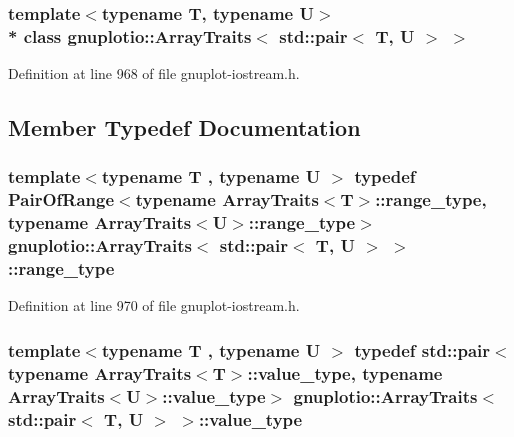 \subsubsection*{template$<$typename T, typename U$>$\\*
class gnuplotio\+::\+Array\+Traits$<$ std\+::pair$<$ T, U $>$ $>$}



Definition at line 968 of file gnuplot-\/iostream.\+h.



\subsection{Member Typedef Documentation}
\subsubsection[{\texorpdfstring{range\+\_\+type}{range_type}}]{\setlength{\rightskip}{0pt plus 5cm}template$<$typename T , typename U $>$ typedef {\bf Pair\+Of\+Range}$<$typename {\bf Array\+Traits}$<$T$>$\+::{\bf range\+\_\+type}, typename {\bf Array\+Traits}$<$U$>$\+::{\bf range\+\_\+type}$>$ {\bf gnuplotio\+::\+Array\+Traits}$<$ std\+::pair$<$ T, U $>$ $>$\+::{\bf range\+\_\+type}}\hypertarget{classgnuplotio_1_1_array_traits_3_01std_1_1pair_3_01_t_00_01_u_01_4_01_4_a80b3c6c794a51c78f0c645e5e4c19afc}{}\label{classgnuplotio_1_1_array_traits_3_01std_1_1pair_3_01_t_00_01_u_01_4_01_4_a80b3c6c794a51c78f0c645e5e4c19afc}


Definition at line 970 of file gnuplot-\/iostream.\+h.

\subsubsection[{\texorpdfstring{value\+\_\+type}{value_type}}]{\setlength{\rightskip}{0pt plus 5cm}template$<$typename T , typename U $>$ typedef std\+::pair$<$typename {\bf Array\+Traits}$<$T$>$\+::{\bf value\+\_\+type}, typename {\bf Array\+Traits}$<$U$>$\+::{\bf value\+\_\+type}$>$ {\bf gnuplotio\+::\+Array\+Traits}$<$ std\+::pair$<$ T, U $>$ $>$\+::{\bf value\+\_\+type}}\hypertarget{classgnuplotio_1_1_array_traits_3_01std_1_1pair_3_01_t_00_01_u_01_4_01_4_a143ab4d4cf6693d33e46fa41d3265aab}{}\label{classgnuplotio_1_1_array_traits_3_01std_1_1pair_3_01_t_00_01_u_01_4_01_4_a143ab4d4cf6693d33e46fa41d3265aab}


